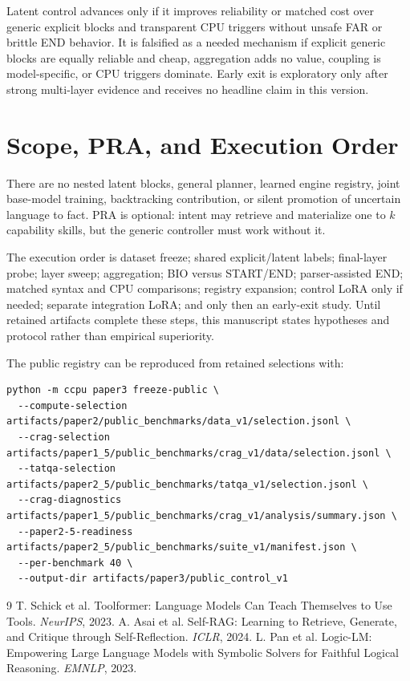 \documentclass[10pt]{article}
\begin{document}
Latent control advances only if it improves reliability or matched cost over
generic explicit blocks and transparent CPU triggers without unsafe FAR or
brittle END behavior. It is falsified as a needed mechanism if explicit generic
blocks are equally reliable and cheap, aggregation adds no value, coupling is
model-specific, or CPU triggers dominate. Early exit is exploratory only after
strong multi-layer evidence and receives no headline claim in this version.

\section{Scope, PRA, and Execution Order}
There are no nested latent blocks, general planner, learned engine registry,
joint base-model training, backtracking contribution, or silent promotion of
uncertain language to fact. PRA is optional: intent may retrieve and materialize
one to $k$ capability skills, but the generic controller must work without it.

The execution order is dataset freeze; shared explicit/latent labels;
final-layer probe; layer sweep; aggregation; BIO versus START/END;
parser-assisted END; matched syntax and CPU comparisons; registry expansion;
control LoRA only if needed; separate integration LoRA; and only then an
early-exit study. Until retained artifacts complete these steps, this manuscript
states hypotheses and protocol rather than empirical superiority.

The public registry can be reproduced from retained selections with:
\begin{verbatim}
python -m ccpu paper3 freeze-public \
  --compute-selection artifacts/paper2/public_benchmarks/data_v1/selection.jsonl \
  --crag-selection artifacts/paper1_5/public_benchmarks/crag_v1/data/selection.jsonl \
  --tatqa-selection artifacts/paper2_5/public_benchmarks/tatqa_v1/selection.jsonl \
  --crag-diagnostics artifacts/paper1_5/public_benchmarks/crag_v1/analysis/summary.json \
  --paper2-5-readiness artifacts/paper2_5/public_benchmarks/suite_v1/manifest.json \
  --per-benchmark 40 \
  --output-dir artifacts/paper3/public_control_v1
\end{verbatim}

\begin{thebibliography}{9}
\bibitem{toolformer} T. Schick et al. Toolformer: Language Models Can Teach
Themselves to Use Tools. \emph{NeurIPS}, 2023.
\bibitem{selfrag} A. Asai et al. Self-RAG: Learning to Retrieve, Generate, and
Critique through Self-Reflection. \emph{ICLR}, 2024.
 L. Pan et al. Logic-LM: Empowering Large Language Models with
Symbolic Solvers for Faithful Logical Reasoning. \emph{EMNLP}, 2023.
\end{thebibliography}
\end{document}
